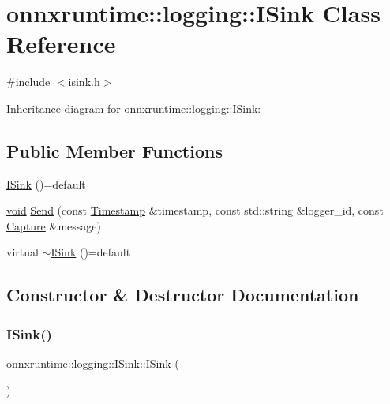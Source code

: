 \hypertarget{classonnxruntime_1_1logging_1_1ISink}{}\section{onnxruntime\+:\+:logging\+:\+:I\+Sink Class Reference}
\label{classonnxruntime_1_1logging_1_1ISink}


{\ttfamily \#include $<$isink.\+h$>$}



Inheritance diagram for onnxruntime\+:\+:logging\+:\+:I\+Sink\+:
\subsection*{Public Member Functions}
\begin{DoxyCompactItemize}
\item 
\mbox{\hyperlink{classonnxruntime_1_1logging_1_1ISink_a3b5949b3a4ab6a7050648a842d34d54d}{I\+Sink}} ()=default
\item 
\mbox{\hyperlink{mlasi_8h_a88f941d423cb2a819b70a1358982b1a6}{void}} \mbox{\hyperlink{classonnxruntime_1_1logging_1_1ISink_a9460947ff02092785dbb4ee7ddddcb4a}{Send}} (const \mbox{\hyperlink{namespaceonnxruntime_1_1logging_ae7a2a84f622a028e2ad495a74289012d}{Timestamp}} \&timestamp, const std\+::string \&logger\+\_\+id, const \mbox{\hyperlink{classonnxruntime_1_1logging_1_1Capture}{Capture}} \&message)
\item 
virtual \mbox{\hyperlink{classonnxruntime_1_1logging_1_1ISink_a30082194671f1a1a612ff29d10e00d42}{$\sim$\+I\+Sink}} ()=default
\end{DoxyCompactItemize}


\subsection{Constructor \& Destructor Documentation}
\mbox{\label{classonnxruntime_1_1logging_1_1ISink_a3b5949b3a4ab6a7050648a842d34d54d}} 
\subsubsection{\texorpdfstring{I\+Sink()}{ISink()}}
{\footnotesize\ttfamily onnxruntime\+::logging\+::\+I\+Sink\+::\+I\+Sink (\begin{DoxyParamCaption}{ }\end{DoxyParamCaption})\hspace{0.3cm}{\ttfamily [default]}}

